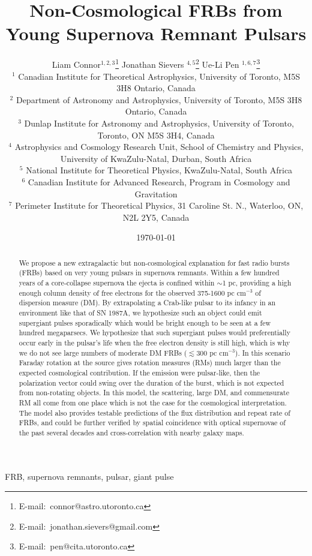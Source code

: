 \documentclass[useAMS,usenatbib]{mn2e}
\title{Non-Cosmological FRBs from Young Supernova Remnant Pulsars}
\author[Connor et al.]{
Liam Connor$^{1,2,3}$\thanks{E-mail:\ connor@astro.utoronto.ca}
Jonathan Sievers $^{4, 5}$\thanks{E-mail:\ jonathan.sievers@gmail.com}
Ue-Li Pen $^{1, 6, 7}$\thanks{E-mail:\ pen@cita.utoronto.ca}
\\
$^1$ Canadian Institute for Theoretical Astrophysics, University of Toronto, M5S 3H8 Ontario, Canada
\\
$^2$ Department of Astronomy and Astrophysics, University of Toronto, 
M5S 3H8 Ontario, Canada
\\
$^3$ Dunlap Institute for Astronomy and Astrophysics, University of Toronto,
Toronto, ON M5S 3H4, Canada
\\
$^4$ Astrophysics and Cosmology Research Unit, School of Chemistry and Physics, University of KwaZulu-Natal, Durban, South Africa
\\
$^5$ National Institute for Theoretical Physics, KwaZulu-Natal, South Africa
\\
$^6$ Canadian Institute for Advanced Research, Program in Cosmology
and Gravitation
\\
$^7$ Perimeter Institute for Theoretical Physics, 31 Caroline St. N., Waterloo, ON, N2L 2Y5, Canada
}
\begin{document}
\date{\today}
\pagerange{\pageref{firstpage}--\pageref{lastpage}} 
\maketitle
\label{firstpage}

\begin{abstract}
We propose a new extragalactic but non-cosmological explanation for fast radio bursts 
(FRBs) based on
very young pulsars in supernova remnants. Within a few hundred years of a 
core-collapse supernova the ejecta 
is confined within $\sim$1 pc, providing a high enough column density of free electrons 
for the observed 375-1600 pc cm$^{-3}$ of dispersion measure (DM). By extrapolating a Crab-like pulsar to 
its infancy in an environment like that of SN 1987A, 
we hypothesize such an object could emit supergiant pulses sporadically which 
would be bright enough to be seen at a few hundred megaparsecs. We hypothesize that
such supergiant pulses would preferentially occur early in the pulsar's life when the 
free electron density is still high, which is why we do not see large numbers of 
moderate DM FRBs ($\lesssim300$ pc cm$^{-3}$). 
In this scenario Faraday
rotation at the source gives rotation measures (RMs) much larger than the expected
cosmological contribution.  If the emission were pulsar-like, then the polarization 
vector could swing over the duration of the burst, which is not expected from 
non-rotating objects.
In this model, the scattering,
large DM, and commensurate RM all come from one place which is not the case for the cosmological
interpretation. The model also provides
testable predictions of the flux distribution and repeat rate of FRBs, and could be further
verified by spatial coincidence with optical supernovae of the past several decades and
cross-correlation with nearby galaxy maps. 
\end{abstract}
\begin{keywords}
FRB, supernova remnants, pulsar, giant pulse
\end{keywords}

\end{document}
